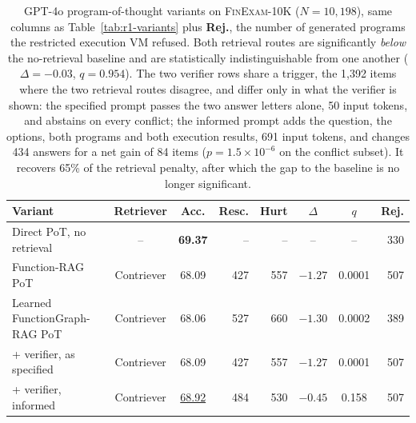 \begin{table}[t]\centering\small
\begin{tabular}{lccrrccr}
\toprule
\textbf{Variant} & \textbf{Retriever} & \textbf{Acc.} & \textbf{Resc.} & \textbf{Hurt} & \textbf{$\Delta$} & \textbf{$q$} & \textbf{Rej.} \\
\midrule
Direct PoT, no retrieval        & --         & \textbf{69.37} & --  & --  & --     & --     & 330 \\
\midrule
Function-RAG PoT                & Contriever & 68.09 & 427 & 557 & $-1.27$ & 0.0001 & 507 \\
Learned FunctionGraph-RAG PoT           & Contriever & 68.06 & 527 & 660 & $-1.30$ & 0.0002 & 389 \\
\quad + verifier, as specified  & Contriever & 68.09 & 427 & 557 & $-1.27$ & 0.0001 & 507 \\
\quad + verifier, informed      & Contriever & \underline{68.92} & 484 & 530 & $-0.45$ & 0.158 & 507 \\
\bottomrule
\end{tabular}
\caption{GPT-4o program-of-thought variants on \textsc{FinExam-10K} ($N=10{,}198$), same
columns as Table~\ref{tab:r1-variants} plus \textbf{Rej.}, the number of generated programs the
restricted execution VM refused. Both retrieval routes are significantly \emph{below} the
no-retrieval baseline and are statistically indistinguishable from one another
($\Delta=-0.03$, $q=0.954$). The two verifier rows share a trigger, the 1{,}392 items where the
two retrieval routes disagree, and differ only in what the verifier is shown: the specified
prompt passes the two answer letters alone, 50 input tokens, and abstains on every conflict;
the informed prompt adds the question, the options, both programs and both execution results,
691 input tokens, and changes 434 answers for a net gain of 84 items ($p=1.5\times10^{-6}$ on
the conflict subset). It recovers 65\% of the retrieval penalty, after which the gap to the
baseline is no longer significant.}
\label{tab:gpt4o-variants}
\end{table}

